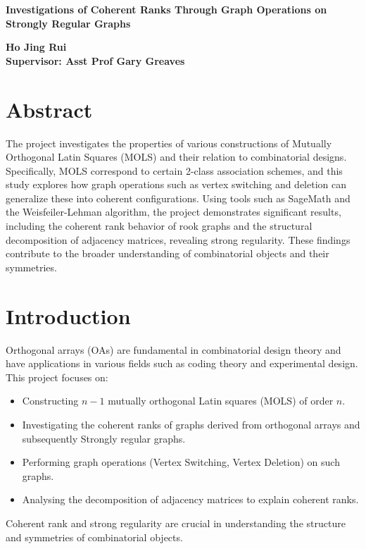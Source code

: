 \documentclass[12pt]{article}
\begin{document}
\begin{titlepage}
    \centering
    \vspace*{1in}
    \Large\textbf{Investigations of Coherent Ranks Through Graph Operations on Strongly Regular Graphs}
    \vspace{1in}

    \large\textbf{Ho Jing Rui}\\
    \textbf{Supervisor: Asst Prof Gary Greaves}\\
    \vfill
\end{titlepage}

\section*{Abstract}
The project investigates the properties of various constructions of Mutually Orthogonal Latin Squares (MOLS) and their relation to combinatorial designs. Specifically, MOLS correspond to certain 2-class association schemes, and this study explores how graph operations such as vertex switching and deletion can generalize these into coherent configurations. Using tools such as SageMath and the Weisfeiler-Lehman algorithm, the project demonstrates significant results, including the coherent rank behavior of rook graphs and the structural decomposition of adjacency matrices, revealing strong regularity. These findings contribute to the broader understanding of combinatorial objects and their symmetries.

\newpage
\tableofcontents
\newpage

\section{Introduction}
Orthogonal arrays (OAs) are fundamental in combinatorial design theory and have applications in various fields such as coding theory and experimental design. This project focuses on:
\begin{itemize}
    \item Constructing \(n-1\) mutually orthogonal Latin squares (MOLS) of order \(n\).
    \item Investigating the coherent ranks of graphs derived from orthogonal arrays and subsequently Strongly regular graphs.
    \item Performing graph operations (Vertex Switching, Vertex Deletion) on such graphs.
    \item Analysing the decomposition of adjacency matrices to explain coherent ranks.
\end{itemize}
Coherent rank and strong regularity are crucial in understanding the structure and symmetries of combinatorial objects.
\end{document}
